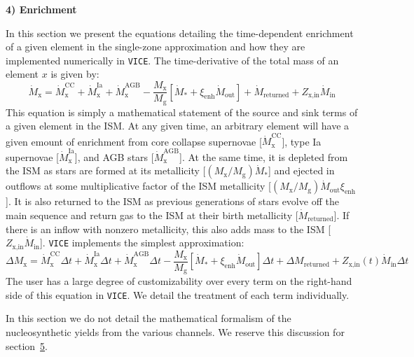 \documentclass{report}
\begin{document}
\null\par\noindent
\hypertarget{sec:enrichment}{\textbf{4) Enrichment}} \par\noindent 
In this section we present the equations detailing the time-dependent 
enrichment of a given element in the single-zone approximation and how they 
are implemented numerically in \texttt{VICE}. The time-derivative of the total 
mass of an element $x$ is given by: 
\begin{equation}
\dot{M}_\text{x} = \dot{M}_\text{x}^\text{CC} + \dot{M}_\text{x}^\text{Ia} + 
\dot{M}_\text{x}^\text{AGB} - \frac{M_\text{x}}{M_\text{g}}[\dot{M}_* + 
\xi_\text{enh}\dot{M}_\text{out}] + \dot{M}_\text{returned} + 
Z_\text{x,in}\dot{M}_\text{in}
\end{equation}
This equation is simply a mathematical statement of the source and sink terms 
of a given element in the ISM. At any given time, an arbitrary element will 
have a given emount of enrichment from core collapse supernovae 
[$\dot{M}_\text{x}^\text{CC}$], type Ia supernovae [$\dot{M}_\text{x}^\text{
Ia}$], and AGB stars [$\dot{M}_\text{x}^\text{AGB}$]. At the same time, it 
is depleted from the ISM as stars are formed at its metallicity 
[$(M_\text{x}/M_\text{g})\dot{M}_*$] and ejected in outflows at some 
multiplicative factor of the ISM metallicity [$(M_\text{x}/M_\text{g})
\dot{M}_\text{out}\xi_\text{enh}$]. It is also returned to the ISM as previous 
generations of stars evolve off the main sequence and return gas to the ISM 
at their birth metallicity [$\dot{M}_\text{returned}$]. If there is an 
inflow with nonzero metallicity, this also adds mass to the ISM 
[$Z_\text{x,in}\dot{M}_\text{in}$]. \texttt{VICE} implements the simplest 
approximation: 
\begin{equation}
\Delta M_\text{x} = \dot{M}_\text{x}^\text{CC}\Delta t + \dot{M}_\text{x}^\text{
Ia}\Delta t + \dot{M}_\text{x}^\text{AGB}\Delta t- \frac{M_\text{x}}
{M_\text{g}}[\dot{M}_* + \xi_\text{enh}\dot{M}_\text{out}]\Delta t + 
\Delta M_\text{returned} + Z_\text{x,in}(t)\dot{M}_\text{in}\Delta t
\end{equation}
The user has a large degree of customizability over every term on the 
right-hand side of this equation in \texttt{VICE}. We detail the treatment 
of each term individually. 
\par
In this section we do not detail the mathematical formalism of the 
nucleosynthetic yields from the various channels. We reserve this discussion 
for section~\hyperlink{sec:yields}{5}. 
\end{document}
